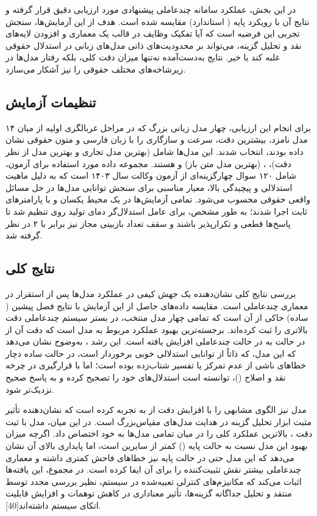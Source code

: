 \documentclass[12pt,a4paper]{report}
\begin{document}
	در این بخش، عملکرد سامانه چندعاملی پیشنهادی مورد ارزیابی دقیق قرار گرفته و نتایج آن با رویکرد پایه ( استاندارد) مقایسه شده است. هدف از این آزمایش‌ها، سنجش تجربی این فرضیه است که آیا تفکیک وظایف در قالب یک معماری  و افزودن لایه‌های نقد و تحلیل گزینه، می‌تواند بر محدودیت‌های ذاتی مدل‌های زبانی در استدلال حقوقی غلبه کند یا خیر. نتایج به‌دست‌آمده نه‌تنها میزان دقت کلی، بلکه رفتار مدل‌ها در زیرشاخه‌های مختلف حقوقی را نیز آشکار می‌سازد.
	
	\subsection{تنظیمات آزمایش}
	
	برای انجام این ارزیابی، چهار مدل زبانی بزرگ که در مراحل غربالگری اولیه از میان ۱۴ مدل نامزد، بیشترین دقت، سرعت و سازگاری را با زبان فارسی و متون حقوقی نشان داده بودند، انتخاب شدند. این مدل‌ها شامل  (بهترین مدل تجاری و بهترین مدل از نظر دقت)،  ، (بهترین مدل متن باز) و  هستند. مجموعه داده مورد استفاده برای آزمون، شامل ۱۲۰ سوال چهارگزینه‌ای از آزمون وکالت سال ۱۴۰۳ است که به دلیل ماهیت استدلالی و پیچیدگی بالا، معیار مناسبی برای سنجش توانایی مدل‌ها در حل مسائل واقعی حقوقی محسوب می‌شود. تمامی آزمایش‌ها در یک محیط یکسان و با پارامترهای ثابت اجرا شدند؛ به طور مشخص، برای عامل استدلال‌گر دمای تولید روی  تنظیم شد تا پاسخ‌ها قطعی و تکرارپذیر باشند و سقف تعداد بازبینی مجاز نیز برابر با ۲ در نظر گرفته شد.
	
	\subsection{نتایج کلی}
	
	بررسی نتایج کلی نشان‌دهنده یک جهش کیفی در عملکرد مدل‌ها پس از استقرار در معماری چندعاملی است. مقایسه داده‌های حاصل از این آزمایش با نتایج فصل پیشین ( ساده) حاکی از آن است که تمامی چهار مدل منتخب، در بستر سیستم چندعاملی دقت بالاتری را ثبت کرده‌اند. برجسته‌ترین بهبود عملکرد مربوط به مدل  است که دقت آن از  در حالت  به  در حالت چندعاملی افزایش یافته است. این رشد ، به‌وضوح نشان می‌دهد که این مدل، که ذاتاً از توانایی استدلالی خوبی برخوردار است، در حالت  ساده دچار خطاهای ناشی از عدم تمرکز یا تفسیر شتاب‌زده بوده است؛ اما با قرارگیری در چرخه نقد و اصلاح ()، توانسته است استدلال‌های خود را تصحیح کرده و به پاسخ صحیح نزدیک‌تر شود.
	
	مدل  نیز الگوی مشابهی را با افزایش دقت از  به  تجربه کرده است که نشان‌دهنده تأثیر مثبت ابزار تحلیل گزینه در هدایت مدل‌های مقیاس‌بزرگ است. در این میان، مدل  با ثبت دقت ، بالاترین عملکرد کلی را در میان تمامی مدل‌ها به خود اختصاص داد. اگرچه میزان بهبود این مدل نسبت به حالت پایه () کمتر از سایرین است، اما پایداری بالای آن نشان می‌دهد که این مدل حتی در حالت پایه نیز خطاهای فاحش کمتری داشته و معماری چندعاملی بیشتر نقش تثبیت‌کننده را برای آن ایفا کرده است. در مجموع، این یافته‌ها اثبات می‌کند که مکانیزم‌های کنترلی تعبیه‌شده در سیستم، نظیر بررسی مجدد توسط منتقد و تحلیل جداگانه گزینه‌ها، تأثیر معناداری در کاهش توهمات و افزایش قابلیت اتکای سیستم داشته‌اند[40].
	
\end{document}

